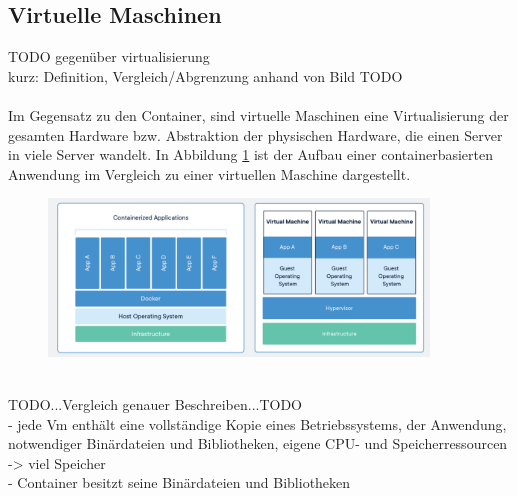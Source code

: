 \subsection{Virtuelle Maschinen}
TODO gegenüber virtualisierung\\
kurz: Definition, Vergleich/Abgrenzung anhand von Bild TODO\\
\\
Im Gegensatz zu den Container, sind virtuelle Maschinen eine Virtualisierung der gesamten Hardware bzw. Abstraktion der physischen Hardware, die einen Server in viele Server wandelt. In Abbildung \ref{vm} ist der Aufbau einer containerbasierten Anwendung im Vergleich zu einer virtuellen Maschine dargestellt.
\begin{figure}[bth] 
	\centering
	\includegraphics[width=0.9\textwidth]{Graphics/containerVsVm.png}
	\caption{}
	\label{vm}
\end{figure}\\
TODO...Vergleich genauer Beschreiben...TODO\\
- jede Vm enthält eine vollständige Kopie eines Betriebssystems, der Anwendung, notwendiger Binärdateien und Bibliotheken, eigene CPU- und Speicherressourcen -> viel Speicher\\
- Container besitzt seine Binärdateien und Bibliotheken\\

